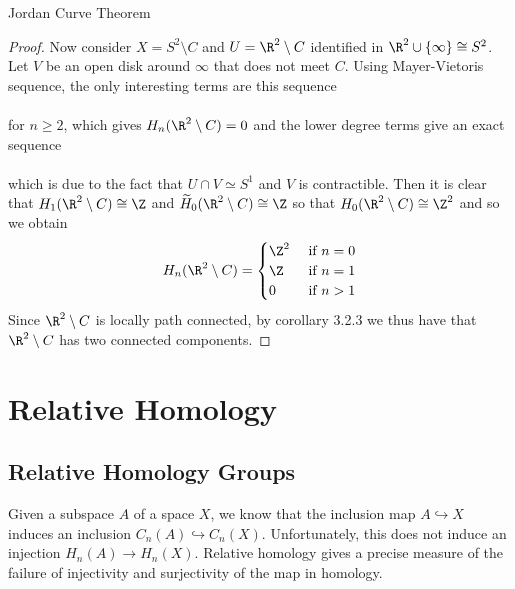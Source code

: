 \documentclass[a4paper]{article}
\begin{document}
\begin{thm}{Jordan Curve Theorem}{}
\begin{proof}
Now consider $X=S^2\setminus C$ and $U=\R^2\setminus C$ identified in $\R^2\cup\{\infty\}\cong S^2$. Let $V$ be an open disk around $\infty$ that does not meet $C$. Using Mayer-Vietoris sequence, the only interesting terms are this sequence \\
\\
for $n\geq 2$, which gives $H_n(\R^2\setminus C)=0$ and the lower degree terms give an exact sequence \\
\\
which is due to the fact that $U\cap V\simeq S^1$ and $V$ is contractible. Then it is clear that $H_1(\R^2\setminus C)\cong\Z$ and $\widetilde{H}_0(\R^2\setminus C)\cong\Z$ so that $H_0(\R^2\setminus C)\cong\Z^2$ and so we obtain $$H_n(\R^2\setminus C)=\begin{cases}
\Z^2 & \text{ if } n=0\\
\Z & \text{ if } n=1\\
0 & \text{ if } n>1
\end{cases}$$
Since $\R^2\setminus C$ is locally path connected, by corollary 3.2.3 we thus have that $\R^2\setminus C$ has two connected components. 
\end{proof}
\end{thm}

\pagebreak
\section{Relative Homology}
\subsection{Relative Homology Groups}
Given a subspace $A$ of a space $X$, we know that the inclusion map $A\hookrightarrow X$ induces an inclusion $C_n(A)\hookrightarrow C_n(X)$. Unfortunately, this does not induce an injection $H_n(A)\to H_n(X)$. Relative homology gives a precise measure of the failure of injectivity and surjectivity of the map in homology. 
\end{document}
